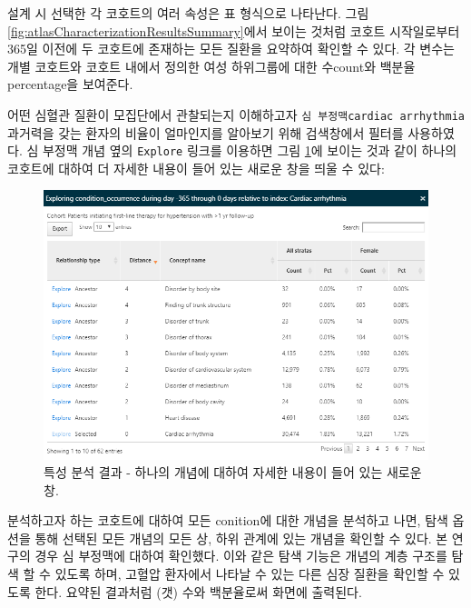 \documentclass[10.5pt]{book}
\theoremstyle{definition}
\theoremstyle{definition}
\theoremstyle{definition}
\theoremstyle{remark}
\begin{document}
설계 시 선택한 각 코호트의 여러 속성은 표 형식으로 나타난다. 그림
\ref{fig:atlasCharacterizationResultsSummary}에서 보이는 것처럼 코호트
시작일로부터 365일 이전에 두 코호트에 존재하는 모든 질환을 요약하여
확인할 수 있다. 각 변수는 개별 코호트와 코호트 내에서 정의한 여성
하위그룹에 대한 수count와 백분율percentage을 보여준다.

어떤 심혈관 질환이 모집단에서 관찰되는지 이해하고자
\texttt{심\ 부정맥cardiac\ arrhythmia} 과거력을 갖는 환자의 비율이
얼마인지를 알아보기 위해 검색창에서 필터를 사용하였다. 심 부정맥 개념
옆의 \texttt{Explore} 링크를 이용하면 그림
\ref{fig:atlasCharacterizationResultsExplore}에 보이는 것과 같이 하나의
코호트에 대하여 더 자세한 내용이 들어 있는 새로운 창을 띄울 수 있다:

\begin{figure}

{\centering \includegraphics[width=1\linewidth]{images/Characterization/atlasCharacterizationResultsExplore} 

}

\caption{특성 분석 결과 - 하나의 개념에 대하여 자세한 내용이 들어 있는 새로운 창.}\label{fig:atlasCharacterizationResultsExplore}
\end{figure}

분석하고자 하는 코호트에 대하여 모든 conition에 대한 개념을 분석하고
나면, 탐색 옵션을 통해 선택된 모든 개념의 모든 상, 하위 관계에 있는
개념을 확인할 수 있다. 본 연구의 경우 심 부정맥에 대하여 확인했다. 이와
같은 탐색 기능은 개념의 계층 구조를 탐색 할 수 있도록 하며, 고혈압
환자에서 나타날 수 있는 다른 심장 질환을 확인할 수 있도록 한다. 요약된
결과처럼 (갯) 수와 백분율로써 화면에 출력된다.
\end{document}
